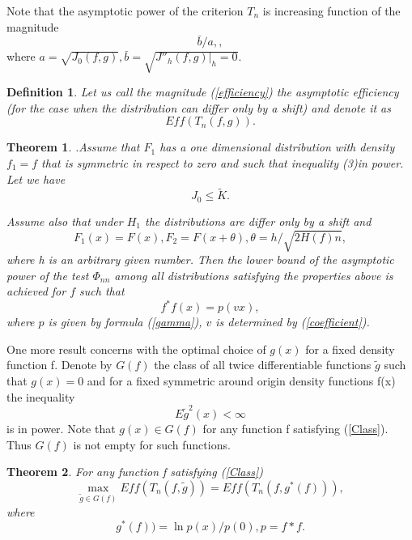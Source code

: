 \documentclass[final,11pt,3p]{elsarticle}
\newtheorem{theorem}{Theorem}
\newtheorem{definition}{Definition}
\begin{document}
Note that the asymptotic power of the criterion $T_n$ is increasing function of the magnitude
\begin{equation}\label{efficiency}
\bar b/a,,
\end{equation}
where $a=\sqrt{J_0(f,g)},\bar b= \sqrt{J''_h(f,g)|_h=0}.$

\begin{definition}Let us call the magnitude (\ref{efficiency}) the {\it asymptotic efficiency} (for the case when the distribution can differ only by a shift) and denote it as 
$$
Eff(T_n(f,g)).
$$
\end{definition}


\begin{theorem}.Assume that $F_1$ has a one dimensional distribution with density $f_1 = f$  that is symmetric in respect to zero  and such that inequality (3)in power.
Let we have
\begin{equation}\label{Bound}
J_0 \leq \tilde K.
\end{equation}

Assume also that under $H_1$ the distributions are differ only by a shift and
$$
F_1(x)= F(x),F_2=F(x+\theta),\theta=h/\sqrt{2H(f)n},$$
where h is an arbitrary given number.
Then the lower bound of the asymptotic power of the test $\Phi_{nn}$ 
 among all distributions satisfying the properties above is achieved for $f$ such that
$$
f^*f(x)= p(vx),
$$
where $p$ is given by formula (\ref{gamma}), $v$ is determined by (\ref{coefficient}).
\end{theorem}
One more result concerns with the optimal choice of $g(x)$ for a fixed density function f.
Denote by $G(f)$ the class of all twice differentiable functions $\tilde g$ such that $g(x)=0$ and for a fixed symmetric around origin density functions f(x) the inequality 
$$
E\tilde g^2(x)< \infty
$$
is in power.
Note that $g(x) \in G(f)$ for any function f satisfying (\ref{Class}). Thus $G(f)$ is not empty for such functions.

\begin{theorem} For any function f satisfying (\ref{Class})
\begin{equation}\label{max property}
\max _{\tilde g \in G(f)} Eff(T_n(f,\tilde g))=Eff(T_n(f,g^*(f))),
\end{equation}
where
$$
g^*(f))=\ln p(x)/p(0), p=f*f.
$$
\end{theorem}
\end{document}
